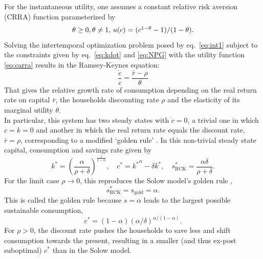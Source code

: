 For the instantaneous utility, one assumes a constant relative risk aversion (CRRA) function parameterized by\\


\begin{equation}
  \theta \geq0, \theta \neq 1$, $u(c) = (c^{1-\theta} -1)/(1-\theta).
  \label{eq:carra}
\end{equation}
Solving the intertemporal optimization problem posed by eq.~\ref{eq:int1} subject to the constraints given by eq.~\eqref{eq:kdot} and \eqref{eq:NPG} with the utility function \eqref{eq:carra} results in the Ramsey-Keynes equation:
\begin{equation}
  \frac{\dot{c}}{c} = \frac{\bar{r} - \rho}{\theta}
  \label{eq:ramsey_keynes}
\end{equation}
That gives the relative growth rate of consumption depending on the real return rate on capital $\bar{r}$, the households discounting rate $\rho$ and the elasticity of its marginal utility $\theta$.\\



In particular, this system has two steady states with $\dot c\!=\!0$, a trivial one in which $c\!=\!k\!=\!0$ and another in which 
the real return rate equals the discount rate, $\bar r \!=\! \rho$, corresponding to a modified `golden rule' \citep[p.300]{Acemoglu2009}. In this non-trivial steady state capital, consumption and savings rate given by
\begin{equation}
	k^\ast = \left(\frac{\alpha}{\rho + \delta}\right)^{\frac{1}{1-\alpha}}, 
 	\quad c^\ast = {k^\ast}^{\alpha} -  \delta k^\ast,
 	\quad s^\ast_\mathrm{RCK} = \frac{\alpha \delta}{\rho + \delta}. \label{eq:rck_steady_state}
\end{equation}
For the limit case $\rho\to 0$, this reproduces the Solow model's golden rule \citep[p.35]{Barro2004}, 
\begin{equation}
  s^\ast_\mathrm{RCK} \! =s_\mathrm{gold} \!=\! \alpha.
  \label{eq:golden_rule}
\end{equation}
This is called the golden rule because $s = \alpha$ leads to the largest possible sustainable consumption,
\begin{equation}
        c^\ast \! =\!(1\! -\! \alpha)(\alpha/\delta)^{\alpha/(1-\alpha)}.
        \label{eq:golden_rule_consumption}
\end{equation}
For $\rho \! > \!0$, the discount rate pushes the households to save less and shift consumption towards the present, resulting in a smaller (and thus ex-post suboptimal) $c^\ast$ than in the Solow model.

